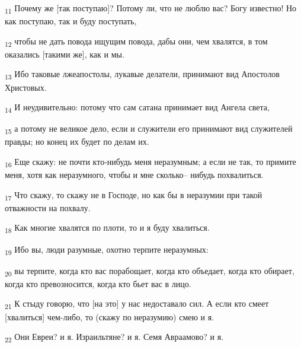 \begin{tcolorbox}
\textsubscript{11} Почему же [так поступаю]? Потому ли, что не люблю вас? Богу известно! Но как поступаю, так и буду поступать,
\end{tcolorbox}
\begin{tcolorbox}
\textsubscript{12} чтобы не дать повода ищущим повода, дабы они, чем хвалятся, в том оказались [такими же], как и мы.
\end{tcolorbox}
\begin{tcolorbox}
\textsubscript{13} Ибо таковые лжеапостолы, лукавые делатели, принимают вид Апостолов Христовых.
\end{tcolorbox}
\begin{tcolorbox}
\textsubscript{14} И неудивительно: потому что сам сатана принимает вид Ангела света,
\end{tcolorbox}
\begin{tcolorbox}
\textsubscript{15} а потому не великое дело, если и служители его принимают вид служителей правды; но конец их будет по делам их.
\end{tcolorbox}
\begin{tcolorbox}
\textsubscript{16} Еще скажу: не почти кто-нибудь меня неразумным; а если не так, то примите меня, хотя как неразумного, чтобы и мне сколько-- нибудь похвалиться.
\end{tcolorbox}
\begin{tcolorbox}
\textsubscript{17} Что скажу, то скажу не в Господе, но как бы в неразумии при такой отважности на похвалу.
\end{tcolorbox}
\begin{tcolorbox}
\textsubscript{18} Как многие хвалятся по плоти, то и я буду хвалиться.
\end{tcolorbox}
\begin{tcolorbox}
\textsubscript{19} Ибо вы, люди разумные, охотно терпите неразумных:
\end{tcolorbox}
\begin{tcolorbox}
\textsubscript{20} вы терпите, когда кто вас порабощает, когда кто объедает, когда кто обирает, когда кто превозносится, когда кто бьет вас в лицо.
\end{tcolorbox}
\begin{tcolorbox}
\textsubscript{21} К стыду говорю, что [на это] у нас недоставало сил. А если кто смеет [хвалиться] чем-либо, то (скажу по неразумию) смею и я.
\end{tcolorbox}
\begin{tcolorbox}
\textsubscript{22} Они Евреи? и я. Израильтяне? и я. Семя Авраамово? и я.
\end{tcolorbox}
